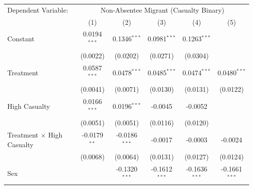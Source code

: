 \begingroup
\centering
\renewcommand{\arraystretch}{0.75}   %
\setlength{\aboverulesep}{0pt}       %
\setlength{\belowrulesep}{0pt}
\begin{tabular}{lccccc}
   \tabularnewline \midrule \midrule
   Dependent Variable: & \multicolumn{5}{c}{Non-Absentee Migrant (Casualty Binary)}\\
                                                            
                                                     & (1)            & (2)                            & (3)                     & (4)                     & (5)\\  
   \midrule
   
   Constant                                                & 0.0194$^{***}$ & 0.1346$^{***}$                 & 0.0981$^{***}$          & 0.1263$^{***}$          &   \\   
                                                           & (0.0022)       & (0.0202)                       & (0.0271)                & (0.0304)                &   \\   
   Treatment                                               & 0.0587$^{***}$ & 0.0478$^{***}$                 & 0.0485$^{***}$          & 0.0474$^{***}$          & 0.0480$^{***}$\\   
                                                           & (0.0041)       & (0.0071)                       & (0.0130)                & (0.0131)                & (0.0122)\\   
   High Casualty                        & 0.0166$^{***}$ & 0.0196$^{***}$                 & -0.0045                 & -0.0052                 &   \\   
                                                           & (0.0051)       & (0.0051)                       & (0.0116)                & (0.0120)                &   \\   
   Treatment $\times$ High Casualty     & -0.0179$^{**}$ & -0.0186$^{***}$                & -0.0017                 & -0.0003                 & -0.0024\\   
                                                           & (0.0068)       & (0.0064)                       & (0.0131)                & (0.0127)                & (0.0124)\\   
   Sex                                                     &                & -0.1320$^{***}$                & -0.1612$^{***}$         & -0.1636$^{***}$         & -0.1661$^{***}$\\   

\end{tabular}
